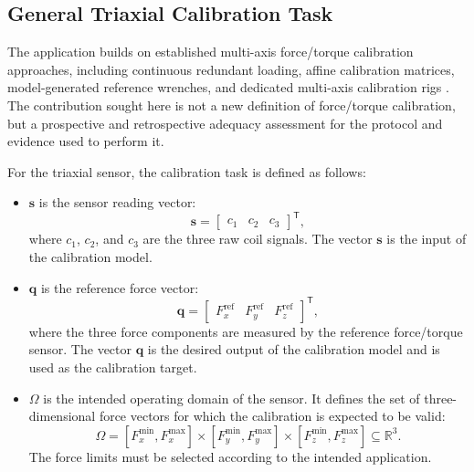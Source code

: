 \documentclass[11pt,a4paper]{article}
\begin{document}
\subsection{General Triaxial Calibration Task}

The application builds on established multi-axis force/torque calibration
approaches, including continuous redundant loading, affine calibration
matrices, model-generated reference wrenches, and dedicated multi-axis
calibration rigs \cite{voyles1997,andrade2016,wang2022machine}. The contribution
sought here is not a new definition of force/torque calibration, but a
prospective and retrospective adequacy assessment for the protocol and evidence
used to perform it.

For the triaxial sensor, the calibration task is defined as follows:
\begin{itemize}
    \item $\mathbf{s}$ is the sensor reading vector:
    \begin{equation}
        \mathbf{s}
        =
        \begin{bmatrix}
            c_1 & c_2 & c_3
        \end{bmatrix}^{\mathsf{T}},
    \end{equation}
    where $c_1$, $c_2$, and $c_3$ are the three raw coil signals.
    The vector $\mathbf{s}$ is the input of the calibration model.

    \item $\mathbf{q}$ is the reference force vector:
    \begin{equation}
        \mathbf{q}
        =
        \begin{bmatrix}
            F_x^{\mathrm{ref}} &
            F_y^{\mathrm{ref}} &
            F_z^{\mathrm{ref}}
        \end{bmatrix}^{\mathsf{T}},
    \end{equation}
    where the three force components are measured by the reference
    force/torque sensor. The vector $\mathbf{q}$ is the desired output of the
    calibration model and is used as the calibration target.

    \item $\Omega$ is the intended operating domain of the sensor. It defines
    the set of three-dimensional force vectors for which the calibration is
    expected to be valid:
    \begin{equation}
        \Omega
        =
        [F_x^{\min},F_x^{\max}]
        \times
        [F_y^{\min},F_y^{\max}]
        \times
        [F_z^{\min},F_z^{\max}]
        \subseteq \mathbb{R}^{3}.
    \end{equation}
    The force limits must be selected according to the intended application.


\end{itemize}
\end{document}
